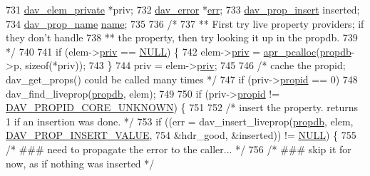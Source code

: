 \begin{DoxyCode}
731         \hyperlink{structdav__elem__private}{dav\_elem\_private} *priv;
732         \hyperlink{structdav__error}{dav\_error} *\hyperlink{group__AP__EXPR_gaccebe6c638c552d2845014cf8bdea8d8}{err};
733         \hyperlink{group__MOD__DAV_ga4c0cd73bce52d0eda981ce54973f27af}{dav\_prop\_insert} inserted;
734         \hyperlink{structdav__prop__name}{dav\_prop\_name} \hyperlink{group__APACHE__CORE__CONFIG_ga06e97fb366205b8f170da3c7562a8677}{name};
735 
736         \textcolor{comment}{/*}
737 \textcolor{comment}{        ** First try live property providers; if they don't handle}
738 \textcolor{comment}{        ** the property, then try looking it up in the propdb.}
739 \textcolor{comment}{        */}
740 
741         \textcolor{keywordflow}{if} (elem->\hyperlink{structapr__xml__elem_a0bc4296aedb5d047325f86080604d939}{priv} == \hyperlink{pcre_8txt_ad7f989d16aa8ca809a36bc392c07fba1}{NULL}) \{
742             elem->\hyperlink{structapr__xml__elem_a0bc4296aedb5d047325f86080604d939}{priv} = \hyperlink{group__apr__pools_gad214fc0160de3c22b6435e29ea20fce8}{apr\_pcalloc}(\hyperlink{group__MOD__DAV_gac428117c2c7c0121d6e49a52085fd196}{propdb}->p, \textcolor{keyword}{sizeof}(*priv));
743         \}
744         priv = elem->\hyperlink{structapr__xml__elem_a0bc4296aedb5d047325f86080604d939}{priv};
745 
746         \textcolor{comment}{/* cache the propid; dav\_get\_props() could be called many times */}
747         \textcolor{keywordflow}{if} (priv->\hyperlink{structdav__elem__private_a36755d8669f1064c343a127e8e13ed99}{propid} == 0)
748             dav\_find\_liveprop(\hyperlink{group__MOD__DAV_gac428117c2c7c0121d6e49a52085fd196}{propdb}, elem);
749 
750         \textcolor{keywordflow}{if} (priv->\hyperlink{structdav__elem__private_a36755d8669f1064c343a127e8e13ed99}{propid} != \hyperlink{props_8c_abed82baf7f470b522273a3e37c24c600a818eff638c568a4d2693f06411438f2c}{DAV\_PROPID\_CORE\_UNKNOWN}) \{
751 
752             \textcolor{comment}{/* insert the property. returns 1 if an insertion was done. */}
753             \textcolor{keywordflow}{if} ((err = dav\_insert\_liveprop(\hyperlink{group__MOD__DAV_gac428117c2c7c0121d6e49a52085fd196}{propdb}, elem, 
      \hyperlink{group__MOD__DAV_gga4c0cd73bce52d0eda981ce54973f27afaac24aa1113cbab49a3fbc47398293d8f}{DAV\_PROP\_INSERT\_VALUE},
754                                            &hdr\_good, &inserted)) != \hyperlink{pcre_8txt_ad7f989d16aa8ca809a36bc392c07fba1}{NULL}) \{
755                 \textcolor{comment}{/* ### need to propagate the error to the caller... */}
756                 \textcolor{comment}{/* ### skip it for now, as if nothing was inserted */}

\end{DoxyCode}
